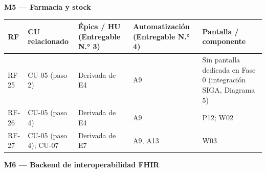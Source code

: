 \documentclass[11pt,a4paper]{article}
\begin{document}
\textbf{M5 --- Farmacia y stock}

{\small
\begin{longtable}[]{@{}
  >{\raggedright\arraybackslash}p{}
  >{\raggedright\arraybackslash}p{}
  >{\raggedright\arraybackslash}p{}
  >{\raggedright\arraybackslash}p{}
  >{\raggedright\arraybackslash}p{}@{}}
\toprule\noalign{}
\begin{minipage}[b]{\linewidth}\raggedright
RF
\end{minipage} & \begin{minipage}[b]{\linewidth}\raggedright
CU relacionado
\end{minipage} & \begin{minipage}[b]{\linewidth}\raggedright
Épica / HU (Entregable N.° 3)
\end{minipage} & \begin{minipage}[b]{\linewidth}\raggedright
Automatización (Entregable N.° 4)
\end{minipage} & \begin{minipage}[b]{\linewidth}\raggedright
Pantalla / componente
\end{minipage} \\
\midrule\noalign{}
\endhead
\bottomrule\noalign{}
\endlastfoot
RF-25 & CU-05 (paso 2) & Derivada de E4 & A9 & Sin pantalla dedicada en Fase 0 (integración SIGA, Diagrama 5) \\
RF-26 & CU-05 (paso 4) & Derivada de E4 & A9 & P12; W02 \\
RF-27 & CU-05 (paso 4); CU-07 & Derivada de E7 & A9, A13 & W03 \\
\end{longtable}
}

\textbf{M6 --- Backend de interoperabilidad FHIR}
\end{document}

